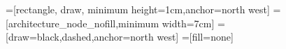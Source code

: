 \newcommand{\onethird}{2.333333333cm}

\usetikzlibrary{positioning,fit,matrix}
=[rectangle, draw, minimum height=1cm,anchor=north west]
=[architecture_node_nofill,minimum width=7cm]
=[draw=black,dashed,anchor=north west]
=[fill=none] %